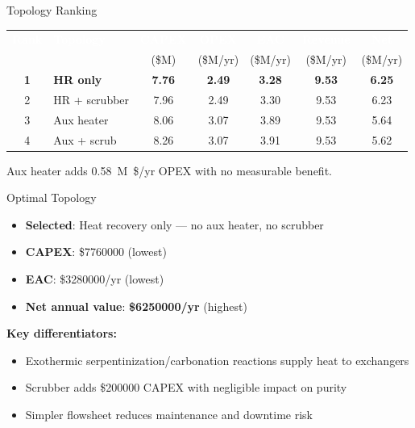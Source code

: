 \documentclass[aspectratio=169]{beamer}
\begin{document}
\begin{frame}{Topology Ranking}
\begin{table}
\centering
\small
\begin{tabular}{@{}clccccc@{}}
\toprule
\textbf{\textcolor{white}{Rank}} & \textbf{\textcolor{white}{Topology}} & \textbf{\textcolor{white}{CAPEX}}
  & \textbf{\textcolor{white}{OPEX}} & \textbf{\textcolor{white}{EAC}}
  & \textbf{\textcolor{white}{Revenue}} & \textbf{\textcolor{white}{Net}} \\
& & \textcolor{StepGrey}{(\$M)} & \textcolor{StepGrey}{(\$M/yr)} & \textcolor{StepGrey}{(\$M/yr)}
  & \textcolor{StepGrey}{(\$M/yr)} & \textcolor{StepGrey}{(\$M/yr)} \\
\midrule
\textbf{\textcolor{StepTeal}{1}} & \textbf{\textcolor{StepTeal}{HR only}} & \textbf{7.76} & \textbf{2.49} & \textbf{3.28}
  & \textbf{9.53} & \textcolor{StepGreen}{\textbf{6.25}} \\
2 & HR + scrubber & 7.96 & 2.49 & 3.30 & 9.53 & 6.23 \\
3 & Aux heater    & 8.06 & 3.07 & 3.89 & 9.53 & 5.64 \\
4 & Aux + scrub   & 8.26 & 3.07 & 3.91 & 9.53 & 5.62 \\
\bottomrule
\end{tabular}
\end{table}
\vspace{6pt}
\centering
\small Aux heater adds \SI{0.58}{M\$/yr} OPEX with no measurable benefit.
\end{frame}

\begin{frame}{Optimal Topology}
\begin{itemize}
    \item \textbf{Selected}: Heat recovery only — no aux heater, no scrubber
    \item \textbf{CAPEX}: \$\num{7760000} (lowest)
    \item \textbf{EAC}: \$\num{3280000}/yr (lowest)
    \item \textbf{Net annual value}: \textcolor{StepGreen}{\textbf{\$\num{6250000}/yr}} (highest)
\end{itemize}
\vspace{12pt}
\textbf{Key differentiators:}
\begin{itemize}
    \item Exothermic serpentinization/carbonation reactions supply heat to exchangers
    \item Scrubber adds \$\num{200000} CAPEX with negligible impact on purity
    \item Simpler flowsheet reduces maintenance and downtime risk
\end{itemize}
\end{frame}
\end{document}
